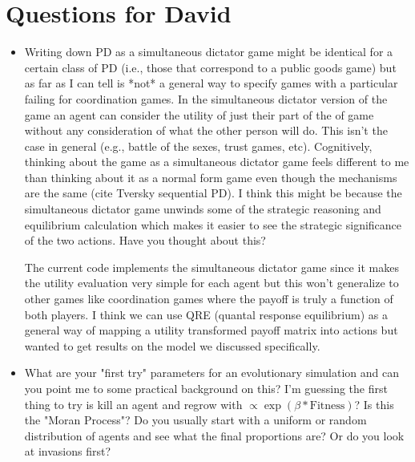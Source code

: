 \documentclass[doc, natbib]{apa6}
\theoremstyle{definition}
\begin{document}
\section{Questions for David}
\begin{itemize}
\item Writing down PD as a simultaneous dictator game might be identical for a certain class of PD (i.e., those that correspond to a public goods game) but as far as I can tell is *not* a general way to specify games with a particular failing for coordination games. In the simultaneous dictator version of the game an agent can consider the utility of just their part of the of game without any consideration of what the other person will do. This isn't the case in general (e.g., battle of the sexes, trust games, etc). Cognitively, thinking about the game as a simultaneous dictator game feels different to me than thinking about it as a normal form game even though the mechanisms are the same (cite Tversky sequential PD). I think this might be because the simultaneous dictator game unwinds some of the strategic reasoning and equilibrium calculation which makes it easier to see the strategic significance of the two actions. Have you thought about this? 

The current code implements the simultaneous dictator game since it makes the utility evaluation very simple for each agent but this won't generalize to other games like coordination games where the payoff is truly a function of both players. I think we can use QRE (quantal response equilibrium) as a general way of mapping a utility transformed payoff matrix into actions but wanted to get results on the model we discussed specifically. 

\item What are your "first try" parameters for an evolutionary simulation and can you point me to some practical background on this? I'm guessing the first thing to try is kill an agent and regrow with $ \propto \exp(\beta * \text{Fitness})$? Is this the "Moran Process"? Do you usually start with a uniform or random distribution of agents and see what the final proportions are? Or do you look at invasions first? 
\end{itemize}
\end{document}
